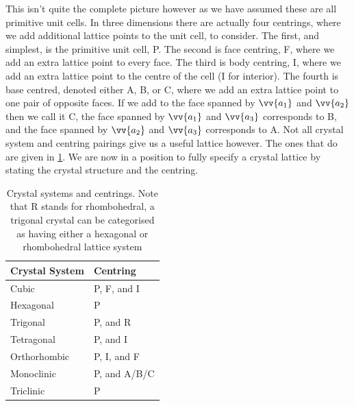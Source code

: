 \documentclass[fleqn]{NotesClass}
\begin{document}
    This isn't quite the complete picture however as we have assumed these are all primitive unit cells.
    In three dimensions there are actually four centrings, where we add additional lattice points to the unit cell, to consider.
    The first, and simplest, is the primitive unit cell, P.
    The second is face centring, F, where we add an extra lattice point to every face.
    The third is body centring, I, where we add an extra lattice point to the centre of the cell (I for interior).
    The fourth is base centred, denoted either A, B, or C, where we add an extra lattice point to one pair of opposite faces.
    If we add to the face spanned by \(\vv{a_1}\) and \(\vv{a_2}\) then we call it C, the face spanned by \(\vv{a_1}\) and \(\vv{a_3}\) corresponds to B, and the face spanned by \(\vv{a_2}\) and \(\vv{a_3}\) corresponds to A.
    Not all crystal system and centring pairings give us a useful lattice however.
    The ones that do are given in \cref{tab:crystal system centring}.
    We are now in a position to fully specify a crystal lattice by stating the crystal structure and the centring.
    \begin{table}
        \caption[Crystal structure centrings.]{Crystal systems and centrings. Note that R stands for rhombohedral, a trigonal crystal can be categorised as having either a hexagonal or rhombohedral lattice system}
        \label{tab:crystal system centring}
        \begin{tabular}{ll}\toprule
            Crystal System & Centring\\\midrule
            Cubic & P, F, and I\\
            Hexagonal & P\\
            Trigonal & P, and R\\
            Tetragonal & P, and I\\
            Orthorhombic & P, I, and F\\
            Monoclinic & P, and A/B/C\\
            Triclinic & P\\\bottomrule
        \end{tabular}
    \end{table}
\end{document}
